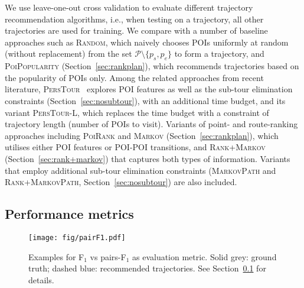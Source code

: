 We use leave-one-out cross validation to evaluate different trajectory recommendation algorithms,
i.e., when testing on a trajectory, all other trajectories are used for training.
We compare with a number of baseline approaches such as \textsc{Random}, 
which naively chooses POIs uniformly at random (without replacement) from the set $\mathcal{P} \setminus \{p_s, p_e \}$ to form a trajectory,
and \textsc{PoiPopularity} (Section~\ref{sec:rankplan}), which recommends trajectories based on the popularity of POIs only.
Among the related approaches from recent literature, 
\textsc{PersTour}~\cite{ijcai15} explores POI features as well as the sub-tour elimination constraints (Section~\ref{sec:nosubtour}), 
with an additional time budget, and its variant \textsc{PersTour-L}, 
which replaces the time budget with a constraint of trajectory length (number of POIs to visit).
Variants of point- and route-ranking approaches including \textsc{PoiRank} and \textsc{Markov} (Section~\ref{sec:rankplan}),
which utilises either POI features or POI-POI transitions,
and \textsc{Rank+Markov} (Section~\ref{sec:rank+markov}) that captures both types of information. %
Variants that employ additional sub-tour elimination constraints 
(\textsc{MarkovPath} and \textsc{Rank+MarkovPath}, Section~\ref{sec:nosubtour}) are also included.






\subsection{Performance metrics}
\label{sec:metric}
\secmoveup

\begin{figure}[t]
	\centering
	\texttt{[image: fig/pairF1.pdf]}
	\caption{Examples for F$_1$ vs pairs-F$_1$ as evaluation metric. 
Solid grey: ground truth; dashed blue: recommended trajectories. See Section~\ref{sec:metric} for details.}
	\label{fig:pairf1}\captionmoveup
\end{figure}

